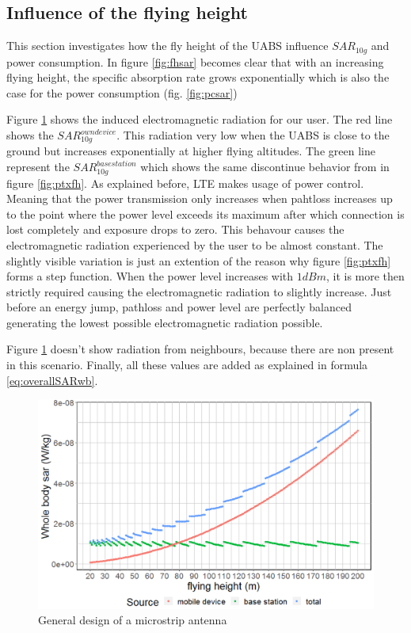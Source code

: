 \subsection{Influence of the flying height}
\label{sub:senario1_influenceOfFlyHeight}

This section investigates how the fly height of the \gls{UABS} influence $SAR_{10g}$ and power consumption. In figure \ref{fig:fhsar}
becomes clear that with an increasing flying height, the specific absorption rate grows exponentially 
which is also the case for the power consumption (fig. \ref{fig:pcsar})  

Figure \ref{fig:s1_fhsar} shows the induced electromagnetic radiation for our user. The red line shows the $SAR^{own device}_{10g}$. This radiation very low when the \gls{UABS}
is close to the ground but increases exponentially at higher flying altitudes. The green line represent the $SAR^{basestation}_{10g}$ which shows the same discontinue 
behavior from in figure \ref{fig:ptxfh}. As explained before, \gls{LTE} makes usage of power control. Meaning that the power transmission only increases when pahtloss 
increases up to the point where the power level exceeds its maximum after which connection is lost completely and exposure drops to zero. 
This behavour causes the electromagnetic radiation experienced by the user to be almost constant. The slightly visible variation is just an extention of the reason 
why figure \ref{fig:ptxfh} forms a step function. When the power level increases with $1 dBm$, it is more then strictly required causing the electromagnetic radiation to 
slightly increase. Just before an energy jump, pathloss and power level are perfectly balanced generating the lowest possible electromagnetic radiation possible.

Figure \ref{fig:s1_fhsar} doesn't show radiation from neighbours, because there are non present in this scenario. Finally, all these values are added as explained in formula
\ref{eq:overallSARwb}.

\begin{figure}[th!]
  \includegraphics[width=\textwidth]{../results/s1/fhvssar2.png}
  \caption{General design of a microstrip antenna}
  \label{fig:s1_fhsar}
\end{figure}

